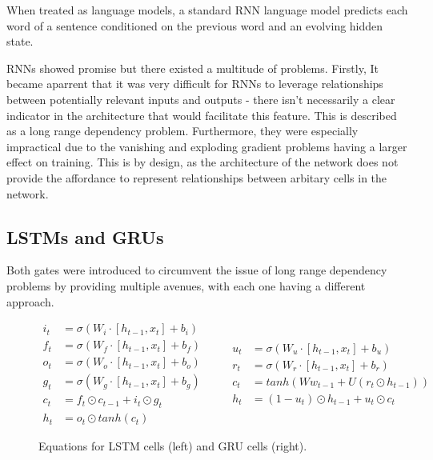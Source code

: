 \documentclass[12pt,twoside]{report}
\begin{document}
When treated as language models, a standard RNN language model predicts each word of a sentence conditioned on the previous word and an evolving hidden state.

RNNs showed promise but there existed a multitude of problems. Firstly, It became aparrent that it was very difficult for RNNs to leverage relationships between potentially relevant inputs and outputs - there isn't necessarily a clear indicator in the architecture that would facilitate this feature. This is described as a long range dependency problem. Furthermore, they were especially impractical due to the vanishing and exploding gradient problems having a larger effect on training. This is by design, as the architecture of the network does not provide the affordance to represent relationships between arbitary cells in the network.

\subsection{LSTMs and GRUs} 

Both gates were introduced to circumvent the issue of long range dependency problems by providing multiple avenues, with each one having a different approach.

\begin{figure}[!ht]
\begin{equation}
  \begin{split}
    i_t &= \sigma(W_i \cdot [h_{t-1},x_t] + b_i) \\
    f_t &= \sigma(W_f \cdot [h_{t-1},x_t] + b_f) \\
		o_t &= \sigma(W_o \cdot [h_{t-1},x_t] + b_o) \\
		g_t &= \sigma(W_g \cdot [h_{t-1},x_t] + b_g) \\
		c_t &= f_t \odot c_{t-1} + i_t \odot g_t \\
		h_t &= o_t \odot tanh(c_t) 
  \end{split}
	\quad\quad
  \begin{split}
		u_t &= \sigma(W_u \cdot [h_{t-1},x_t] + b_u) \\
		r_t &= \sigma(W_r \cdot [h_{t-1},x_t] + b_r) \\
		c_t &= tanh(Ww_{t-1}+U(r_t \odot h_{t-1})) \\
		h_t &= (1-u_{t})\odot h_{t-1} + u_t \odot c_t
  \end{split}
\end{equation}
\caption{Equations for LSTM cells (left) and GRU cells (right).}
\end{figure}
 
\end{document}
